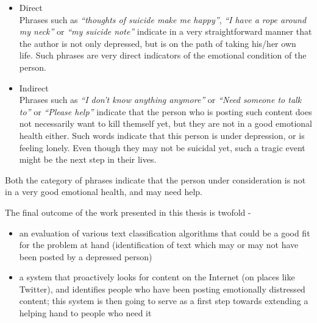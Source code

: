 \begin{itemize}
    \item{
    Direct\\
    Phrases such as \emph{``thoughts of suicide make me happy''}, \emph{``I have a rope around my neck''} or \emph{``my suicide note''} indicate in a very straightforward manner that the author is not only depressed, but is on the path of taking his/her own life. Such phrases are very direct indicators of the emotional condition of the person.
    }
    \item{
    Indirect\\
    Phrases such as \emph{``I don't know anything anymore''} or \emph{``Need someone to talk to''} or \emph{``Please help''} indicate that the person who is posting such content does not necessarily want to kill themself yet, but they are not in a good emotional health either. Such words indicate that this person is under depression, or is feeling lonely. Even though they may not be suicidal yet, such a tragic event might be the next step in their lives. 
    }
\end{itemize}

Both the category of phrases indicate that the person under consideration is not in a very good emotional health, and may need help.

The final outcome of the work presented in this thesis is twofold -
\begin{itemize}
    \item{an evaluation of various text classification algorithms that could be a good fit for the problem at hand (identification of text which may or may not have been posted by a depressed person)}
    \item{a system that proactively looks for content on the Internet (on places like Twitter), and identifies people who have been posting emotionally distressed content; this system is then going to serve as a first step towards extending a helping hand to people who need it}
\end{itemize}
